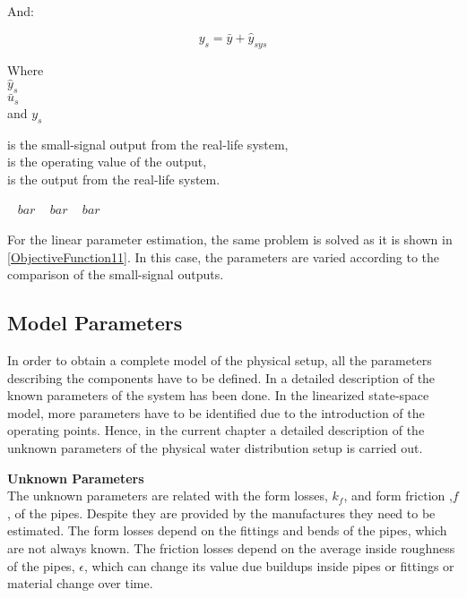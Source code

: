 And:

\begin{equation}
  y_{s} = \bar{y} + \hat{y}_{sys} 
 \label{u_smallsignal}
\end{equation}

\begin{minipage}[t]{0.20\textwidth}
Where\\
\hspace*{8mm} $\hat{y}_{s}$ \\
\hspace*{8mm} $\bar{u}_{s}$ \\
and \hspace*{0.7mm} $y_{s}$ 
\end{minipage}
\begin{minipage}[t]{0.68\textwidth}
\vspace*{2mm}
is the small-signal output from the real-life system, \\
is the operating value of the output,\\
is the output from the real-life system. 
\end{minipage}
\begin{minipage}[t]{0.10\textwidth}
\vspace*{2mm}
\textcolor{White}{te}$\unit{bar}$
\textcolor{White}{te}$\unit{bar}$
\textcolor{White}{te}$\unit{bar}$
\end{minipage} 

For the linear parameter estimation, the same problem is solved as it is shown in \eqref{ObjectiveFunction11}. In this case, the parameters are varied according to the comparison of the small-signal outputs.  

\subsection{Model Parameters}
\label{estimateParameters}
In order to obtain a complete model of the physical setup, all the parameters describing the components have to be defined. In  a detailed
description of the known parameters of the system has been done. 
In the linearized state-space model, more parameters have to be identified
due to the introduction of the operating points. Hence, in the current chapter a detailed description of the unknown parameters of the physical water distribution setup is carried out.


\textbf{Unknown Parameters}\\
The unknown parameters are related with the form losses, $k_f$, and form friction ,$f$, of the pipes. Despite they are provided by the manufactures they need to be estimated. 
The form losses depend on the fittings and bends of the pipes, which are not always known. 
The friction losses depend on the average inside roughness of the pipes, $\epsilon$, which can change its value due buildups inside pipes or fittings or material change over time. 

